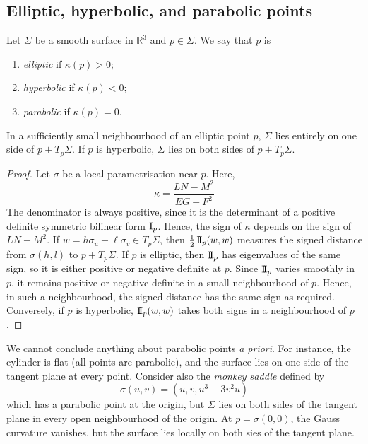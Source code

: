 \subsection{Elliptic, hyperbolic, and parabolic points}
\begin{definition}
	Let \( \Sigma \) be a smooth surface in \( \mathbb R^3 \) and \( p \in \Sigma \).
	We say that \( p \) is
	\begin{enumerate}
		\item \textit{elliptic} if \( \kappa(p) > 0 \);
		\item \textit{hyperbolic} if \( \kappa(p) < 0 \);
		\item \textit{parabolic} if \( \kappa(p) = 0 \).
	\end{enumerate}
\end{definition}
\begin{lemma}
	In a sufficiently small neighbourhood of an elliptic point \( p \), \( \Sigma \) lies entirely on one side of \( p + T_p \Sigma \).
	If \( p \) is hyperbolic, \( \Sigma \) lies on both sides of \( p + T_p \Sigma \).
\end{lemma}
\begin{proof}
	Let \( \sigma \) be a local parametrisation near \( p \).
	Here,
	\[
		\kappa = \frac{LN-M^2}{EG-F^2}
	\]
	The denominator is always positive, since it is the determinant of a positive definite symmetric bilinear form \( \operatorname{\mathrm{I}}_p \).
	Hence, the sign of \( \kappa \) depends on the sign of \( LN-M^2 \).
	If \( w = h \sigma_u + \ell \sigma_v \in T_p \Sigma \), then \( \frac{1}{2} \operatorname{\mathrm{I\!I}}_p(w,w) \) measures the signed distance from \( \sigma(h,l) \) to \( p + T_p \Sigma \).
	If \( p \) is elliptic, then \( \operatorname{\mathrm{I\!I}}_p \) has eigenvalues of the same sign, so it is either positive or negative definite at \( p \).
	Since \( \operatorname{\mathrm{I\!I}}_p \) varies smoothly in \( p \), it remains positive or negative definite in a small neighbourhood of \( p \).
	Hence, in such a neighbourhood, the signed distance has the same sign as required.
	Conversely, if \( p \) is hyperbolic, \( \operatorname{\mathrm{I\!I}}_p(w,w) \) takes both signs in a neighbourhood of \( p \).
\end{proof}
\begin{remark}
	We cannot conclude anything about parabolic points \textit{a priori}.
	For instance, the cylinder is flat (all points are parabolic), and the surface lies on one side of the tangent plane at every point.
	Consider also the \textit{monkey saddle} defined by
	\[
		\sigma(u,v) = (u,v,u^3 - 3v^2 u)
	\]
	which has a parabolic point at the origin, but \( \Sigma \) lies on both sides of the tangent plane in every open neighbourhood of the origin.
	At \( p = \sigma(0,0) \), the Gauss curvature vanishes, but the surface lies locally on both sies of the tangent plane.
\end{remark}
